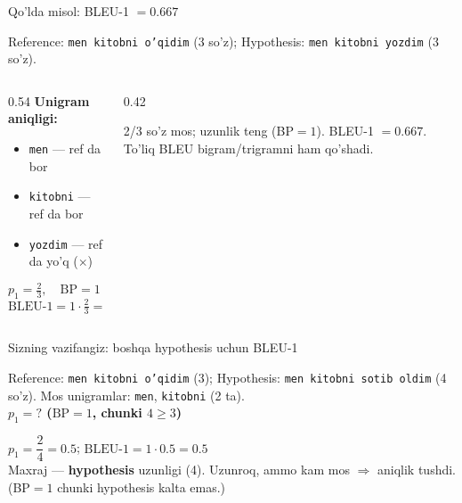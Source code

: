 \documentclass[aspectratio=169,11pt]{beamer}
\begin{document}
\begin{frame}{Qo'lda misol: BLEU-1 $=0.667$}
  \begin{tcolorbox}[defbox,title={Reference va hypothesis}]
    \small
    Reference: \texttt{men kitobni o'qidim} (3 so'z);
    Hypothesis: \texttt{men kitobni yozdim} (3 so'z).
  \end{tcolorbox}
  \vspace{0.2em}
  \begin{columns}[T]
    \begin{column}{0.54\textwidth}
      \textbf{Unigram aniqligi:}
      \begin{itemize}\footnotesize\setlength\itemsep{1pt}
        \item \texttt{men} --- ref da bor \checkmark
        \item \texttt{kitobni} --- ref da bor \checkmark
        \item \texttt{yozdim} --- ref da yo'q ($\times$)
      \end{itemize}
      $$ p_1 = \tfrac{2}{3}, \quad \mathrm{BP}=1 \ (3\ge 3) $$
      $$ \mathrm{BLEU\text{-}1} = 1\cdot\tfrac{2}{3} = \mathbf{0.667} $$
    \end{column}
    \begin{column}{0.42\textwidth}
      \begin{tcolorbox}[okbox,top=2pt,bottom=2pt]
        \footnotesize
        2/3 so'z mos; uzunlik teng (BP$=1$). BLEU-1 $=0.667$. To'liq BLEU
        bigram/trigramni ham qo'shadi.
      \end{tcolorbox}
    \end{column}
  \end{columns}
\end{frame}

\begin{frame}{Sizning vazifangiz: boshqa hypothesis uchun BLEU-1}
  \begin{tcolorbox}[warnbox,title=Savol --- 90 soniya]
    \small
    Reference: \texttt{men kitobni o'qidim} (3); Hypothesis:
    \texttt{men kitobni sotib oldim} (4 so'z). Mos unigramlar: \texttt{men},
    \texttt{kitobni} (2 ta).\\[4pt]
    \textbf{\large $p_1 = ?$ \quad ($\mathrm{BP}=1$, chunki $4\ge 3$)}
  \end{tcolorbox}
  \pause
  \begin{tcolorbox}[okbox,title=Javob]
    \small
    $p_1 = \dfrac{2}{4} = 0.5$; \quad $\mathrm{BLEU\text{-}1} = 1\cdot 0.5 = \mathbf{0.5}$\\[3pt]
    \footnotesize Maxraj --- \textbf{hypothesis} uzunligi (4). Uzunroq, ammo kam mos
    $\Rightarrow$ aniqlik tushdi. (BP$=1$ chunki hypothesis kalta emas.)
  \end{tcolorbox}
\end{frame}
\end{document}
